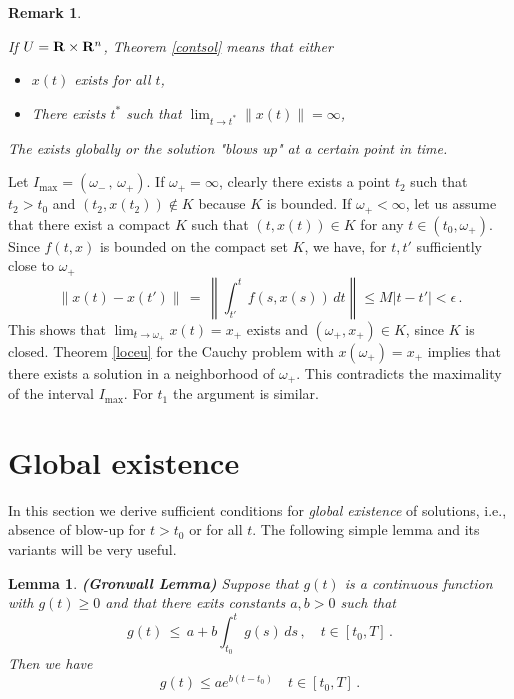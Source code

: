 \documentclass[12pt]{report}
\newcommand{\bR}{{\bf R}}
\newtheorem{lemma}[theorem]{Lemma}
\newtheorem{remark}[theorem]{Remark}
\newcommand{\proof}{\noindent {\em Proof:~}}
\def\qed{\hbox{\hskip 6pt\vrule width6pt height7pt depth1pt
    \hskip1pt}\bigskip}
\def\to{\rightarrow}
\begin{document}
\begin{remark} \label{dichotomy}
{\rm If $U = \bR \times \bR^n$, Theorem \ref{contsol} means that either 
\begin{itemize}
\item $x(t)$ exists for all $t$,
\item There exists $t^*$ such that $\lim_{t \to t^*} \|x(t)\| = \infty$,
\end{itemize}
The exists globally or the solution "blows up" at a
certain point in time.  }
\end{remark}

\proof Let $I_{\max}=(\omega_- \,,\,\omega_+)$. If $\omega_+=\infty$,
clearly there exists a point $t_2$ such that $t_2 > t_0$ and $(t_2,
x(t_2)) \notin K$ because $K$ is bounded.  If $\omega_+ <\infty$, let
us assume that there exist a compact $K$ such that $(t,x(t)) \in K$
for any $t \in (t_0, \omega_+)$. Since $f(t,x)$ is bounded on the
compact set $K$, we have, for $t, t'$ sufficiently close to
$\omega_+$
\begin{equation}
\|x(t) - x(t')\| \,=\, \left\| \int_{t'}^t f(s,x(s))\, dt \right\| 
\le M|t-t'| < \epsilon\,.
\end{equation}
This shows that $\lim_{t \to \omega_+}x(t)=x_+$ exists and $(\omega_+,
x_+) \in K$, since $K$ is closed.  Theorem \ref{loceu} for the Cauchy
problem with $x(\omega_+)=x_+$ implies that there exists a solution in
a neighborhood of $\omega_+$. This contradicts the maximality of the
interval $I_{\max}$.  For $t_1$ the argument is similar. \hfill \qed

\section{Global existence}

In this section we derive sufficient conditions for {\em global existence} 
of solutions, i.e., absence of blow-up for $t>t_0$ or for all $t$.  The following simple 
lemma and its variants will be very useful. 

\begin{lemma}{\bf (Gronwall Lemma)} Suppose that $g(t)$ is a 
continuous function with $g(t) \ge 0$ and that there exits constants 
$a,b > 0$  such that
\begin{equation}
g(t) \,\le \, a + b \int_{t_0}^t g(s) \,ds \,, \quad t \in [t_0,T]\,.
\end{equation}
Then we have
 \begin{equation}
g(t) \le a e^{b(t-t_0)} \quad t \in [t_0,T] \,.
\end{equation}
\end{lemma}
\end{document}
